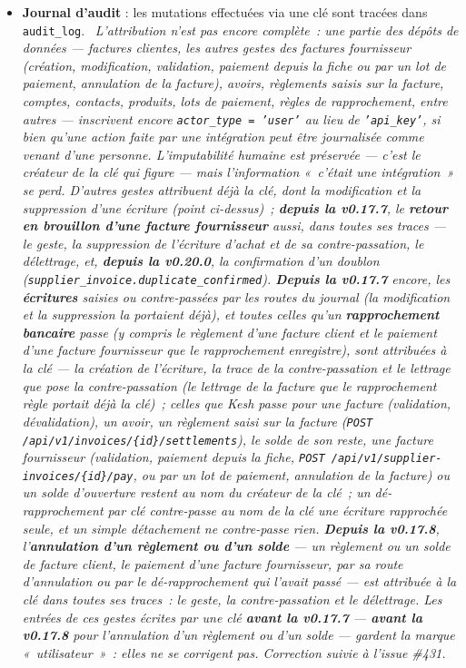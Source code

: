 \documentclass[a4paper,11pt,oneside]{article}
\begin{document}
\begin{itemize}
    \item \textbf{Journal d'audit} : les mutations effectuées via une clé sont tracées dans \texttt{audit\_log}. \keshAttention\ \emph{L'attribution n'est pas encore complète~: une partie des dépôts de données --- factures clientes, les autres gestes des factures fournisseur (création, modification, validation, paiement depuis la fiche ou par un lot de paiement, annulation de la facture), avoirs, règlements saisis sur la facture, comptes, contacts, produits, lots de paiement, règles de rapprochement, entre autres --- inscrivent encore \texttt{actor\_type = 'user'} au lieu de \texttt{'api\_key'}, si bien qu'une action faite par une intégration peut être journalisée comme venant d'une personne. L'imputabilité humaine est préservée --- c'est le créateur de la clé qui figure --- mais l'information «~c'était une intégration~» se perd. D'autres gestes attribuent déjà la clé, dont la modification et la suppression d'une écriture (point ci-dessus)~; \textbf{depuis la v0.17.7}, le \textbf{retour en brouillon d'une facture fournisseur} aussi, dans toutes ses traces --- le geste, la suppression de l'écriture d'achat et de sa contre-passation, le délettrage, et, \textbf{depuis la v0.20.0}, la confirmation d'un doublon (\texttt{supplier\_invoice.duplicate\_confirmed}). \textbf{Depuis la v0.17.7} encore, les \textbf{écritures} saisies ou contre-passées par les routes du journal (la modification et la suppression la portaient déjà), et toutes celles qu'un \textbf{rapprochement bancaire} passe (y compris le règlement d'une facture client et le paiement d'une facture fournisseur que le rapprochement enregistre), sont attribuées à la clé --- la création de l'écriture, la trace de la contre-passation et le lettrage que pose la contre-passation (le lettrage de la facture que le rapprochement règle portait déjà la clé)~; celles que Kesh passe pour une facture (validation, dévalidation), un avoir, un règlement saisi sur la facture (\texttt{POST /api/v1/invoices/\{id\}/settlements}), le solde de son reste, une facture fournisseur (validation, paiement depuis la fiche, \texttt{POST /api/v1/supplier-invoices/\{id\}/pay}, ou par un lot de paiement, annulation de la facture) ou un solde d'ouverture restent au nom du créateur de la clé~; un dé-rapprochement par clé contre-passe au nom de la clé une écriture rapprochée seule, et un simple détachement ne contre-passe rien. \textbf{Depuis la v0.17.8}, l'\textbf{annulation d'un règlement ou d'un solde} --- un règlement ou un solde de facture client, le paiement d'une facture fournisseur, par sa route d'annulation ou par le dé-rapprochement qui l'avait passé --- est attribuée à la clé dans toutes ses traces~: le geste, la contre-passation et le délettrage. Les entrées de ces gestes écrites par une clé \textbf{avant la v0.17.7} --- \textbf{avant la v0.17.8} pour l'annulation d'un règlement ou d'un solde --- gardent la marque «~utilisateur~»~: elles ne se corrigent pas. Correction suivie à l'issue \#431.}
\end{itemize}
\end{document}
